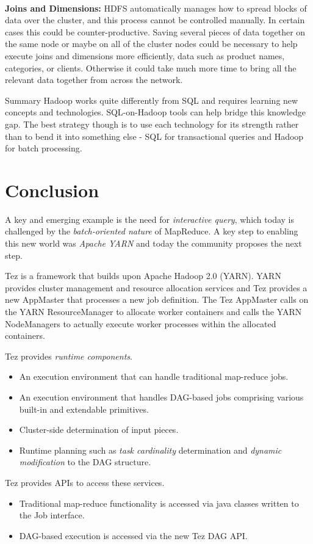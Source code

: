 \documentclass[twocolumn]{article}
\newcommand{\bi}{\begin{itemize}}
\newcommand{\ei}{\end{itemize}}
\newcommand{\ii}{\item}
\begin{document}
\noindent
\\
\textbf{Joins and Dimensions:}
HDFS automatically manages how to spread blocks of data over the cluster, and this process cannot be controlled manually. In certain cases this could be counter-productive. Saving several pieces of data together on the same node or maybe on all of the cluster nodes could be necessary to help execute joins and dimensions more efficiently, data such as product names, categories, or clients. Otherwise it could take much more time to bring all the relevant data together from across the network.

Summary Hadoop works quite differently from SQL and requires learning new concepts and technologies. SQL-on-Hadoop tools can help bridge this knowledge gap. The best strategy though is to use each technology for its strength rather than to bend it into something else - SQL for transactional queries and Hadoop for batch processing.

\section{Conclusion}

A key and emerging example is the need for \emph{interactive query}, which today is challenged by the \emph{batch-oriented nature} of MapReduce. 
A key step to enabling this new world was \emph{Apache YARN} and today the community proposes the next step.

Tez is a framework that builds upon Apache Hadoop 2.0 (YARN).  YARN provides cluster management and resource allocation services and Tez provides a new AppMaster that processes a new job definition.  The Tez AppMaster calls on the YARN ResourceManager to allocate worker containers and calls the YARN NodeManagers to actually execute worker processes within the allocated containers.

\noindent
Tez provides \textit{runtime components}.
\bi
\ii An execution environment that can handle traditional map-reduce jobs. 
\ii An execution environment that handles DAG-based jobs comprising various built-in and extendable primitives.
\ii Cluster-side determination of input pieces.
\ii Runtime planning such as \textit{task cardinality} determination and \textit{dynamic modification} to the DAG structure.
\ei

\noindent
Tez provides APIs to access these services.

\bi
\ii Traditional map-reduce functionality is accessed via java classes written to the Job interface. 
\ii DAG-based execution is accessed via the new Tez DAG API.
\ei
\end{document}
